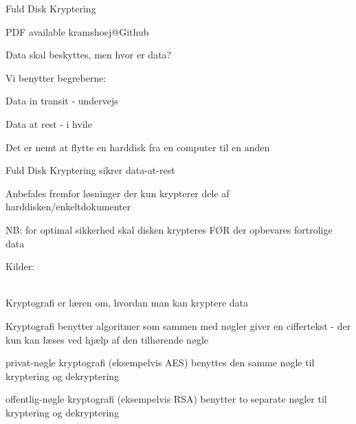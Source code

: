 \documentclass[20pt,landscape,a4paper,footrule]{foils}
\begin{document}

\mytitlepage
{Fuld Disk Kryptering}

\centerline{\footnotesize
 PDF available kramshoej@Github}

\LogoOn

%


\begin{list1}
\item Data skal beskyttes, men hvor er data?
\item Vi benytter begreberne:
\begin{list2}
\item Data in transit - undervejs
\item Data at rest - i hvile
\end{list2}
\item Det er nemt at flytte en harddisk fra en computer til en anden
\item Fuld Disk Kryptering sikrer data-at-rest
\item Anbefales fremfor løsninger der kun krypterer dele af harddisken/enkeltdokumenter
\item NB: for optimal sikkerhed skal disken krypteres FØR der opbevares fortrolige data
\end{list1}

Kilder:\\
\\



\begin{list1}
\item Kryptografi er læren om, hvordan man kan kryptere data
\item Kryptografi benytter algoritmer som sammen med nøgler giver en
  ciffertekst - der kun kan læses ved hjælp af den tilhørende nøgle
\end{list1}



\begin{list1}
\item privat-nøgle kryptografi (eksempelvis AES) benyttes den samme
  nøgle til kryptering og dekryptering
\item offentlig-nøgle kryptografi (eksempelvis RSA) benytter to
  separate nøgler til kryptering og dekryptering
\end{list1}
\end{document}
